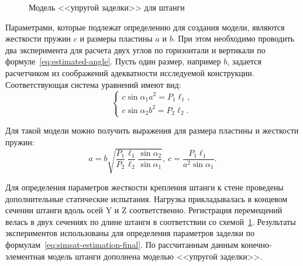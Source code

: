 \begin{figure}[H]
	\caption{Модель <<упругой заделки>> для штанги} \label{fig:simsat-fixture-scheme}
\end{figure}

Параметрами, которые подлежат определению для создания модели, являются жесткости пружин $ c $ и размеры пластины $ a $ и $ b $. При этом необходимо проводить два эксперимента для расчета двух углов по горизонтали и вертикали по формуле~\eqref{eq:estimated-angle}. Пусть один размер, например $ b $, задается расчетчиком из соображений адекватности исследуемой конструкции. Соответствующая система уравнений имеют вид:
\begin{equation}
	\begin{cases}
		c \sin \alpha_1 a ^ 2 = P_1 \ell_1, \\
		c \sin \alpha_2 b ^ 2 = P_2 \ell_2.
	\end{cases}
\end{equation}

Для такой модели можно получить выражения для размера пластины и жесткости пружин:
\begin{equation}
	a = b \sqrt{\frac{P_1}{P_2} \frac{\ell_1}{\ell_2} \frac{\sin \alpha_2}{\sin \alpha_1}}, \ c = \frac{P_1 \ell_1}{a ^ 2 \sin \alpha_1}. \label{eq:simsat-estimation-final}
\end{equation}

Для определения параметров жесткости крепления штанги к стене проведены дополнительные статические испытания. Нагрузка прикладывалась в концевом сечении штанги вдоль осей $ \mathrm{Y} $ и $ \mathrm{Z} $ соответственно. Регистрация перемещений велась в двух сечениях по длине штанги в соответствии со схемой~\ref{fig:simsat-fixture-scheme}. Результаты экспериментов использованы для определения параметров заделки по формулам~\eqref{eq:simsat-estimation-final}. По рассчитанным данным конечно-элементная модель штанги дополнена моделью <<упругой заделки>>. 

